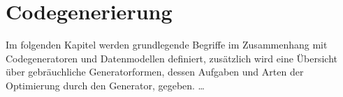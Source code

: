 \chapter{Codegenerierung}
\label{chap:codegeneration}


Im folgenden Kapitel werden grundlegende Begriffe im Zusammenhang mit Codegeneratoren und Datenmodellen definiert, zusätzlich wird eine Übersicht über gebräuchliche Generatorformen, dessen Aufgaben und Arten der Optimierung durch den Generator, gegeben. 
 \ldots





